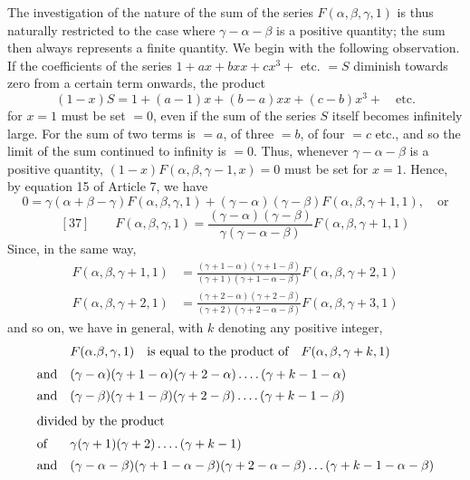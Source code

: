 The investigation of the nature of the sum of the series $F(\alpha,\beta,\gamma,1)$ is thus naturally restricted to the case where $\gamma-\alpha-\beta$ is a positive quantity; the sum then always represents a finite quantity. We begin with the following observation. If the coefficients of the series $1+ax+bxx+cx^3+$ etc. $=S$ diminish towards zero from a certain term onwards, the product
\[
(1-x)S=1+(a-1)x+(b-a)xx+(c-b)x^3+\quad\text{etc.}
\]
for $x=1$ must be set $=0$, even if the sum of the series $S$ itself becomes infinitely large. For the sum of two terms is $=a$, of three $=b$, of four $=c$ etc., and so the limit of the sum continued to infinity is $=0$. Thus, whenever $\gamma-\alpha-\beta$ is a positive quantity, $(1-x)F(\alpha,\beta,\gamma-1,x)=0$ must be set for $x=1$. Hence, by equation 15 of Article 7, we have
\[
0=\gamma(\alpha+\beta-\gamma)F(\alpha,\beta,\gamma,1)+(\gamma-\alpha)(\gamma-\beta)F(\alpha,\beta,\gamma+1,1),\quad\text{or}
\]
\[
[37]\qquad F(\alpha,\beta,\gamma,1)=\frac{(\gamma-\alpha)(\gamma-\beta)}{\gamma(\gamma-\alpha-\beta)}F(\alpha,\beta,\gamma+1,1)
\]
Since, in the same way,
\[
\begin{aligned}
F(\alpha,\beta,\gamma+1,1)&=\frac{(\gamma+1-\alpha)(\gamma+1-\beta)}{(\gamma+1)(\gamma+1-\alpha-\beta)}F(\alpha,\beta,\gamma+2,1)\\[6pt]
F(\alpha,\beta,\gamma+2,1)&=\frac{(\gamma+2-\alpha)(\gamma+2-\beta)}{(\gamma+2)(\gamma+2-\alpha-\beta)}F(\alpha,\beta,\gamma+3,1)
\end{aligned}
\]
and so on, we have in general, with $k$ denoting any positive integer,
\[
\begin{array}{@{}ll@{}}
&F(\alpha.\beta,\gamma,1)\quad\text{is equal to the product of}\quad F(\alpha,\beta,\gamma+k,1)\\[6pt]
\text{and}&(\gamma-\alpha)(\gamma+1-\alpha)(\gamma+2-\alpha)\mathinner{.\,.\,.\,.}(\gamma+k-1-\alpha)\\[5pt]
\text{and}&(\gamma-\beta)(\gamma+1-\beta)(\gamma+2-\beta)\mathinner{.\,.\,.\,.}(\gamma+k-1-\beta)\\[8pt]
\multicolumn{2}{@{}l@{}}{\text{divided by the product}}\\[6pt]
\text{of}&\gamma(\gamma+1)(\gamma+2)\mathinner{.\,.\,.\,.}(\gamma+k-1)\\[5pt]
\text{and}&(\gamma-\alpha-\beta)(\gamma+1-\alpha-\beta)(\gamma+2-\alpha-\beta)\mathinner{.\,.\,.}(\gamma+k-1-\alpha-\beta)
\end{array}
\]

